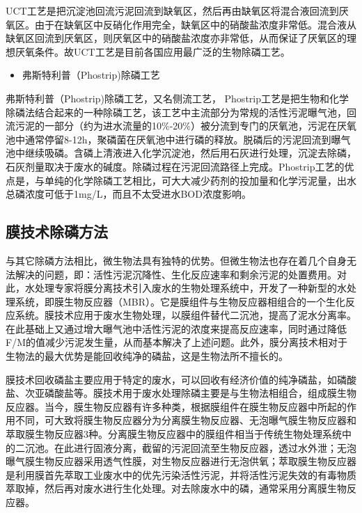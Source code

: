 \documentclass[]{book}
\providecommand{\tightlist}{%
  \setlength{\itemsep}{0pt}\setlength{\parskip}{0pt}}
\begin{document}
UCT工艺是把沉淀池回流污泥回流到缺氧区，然后再由缺氧区将混合液回流到厌氧区。由于在缺氧区中反硝化作用完全，缺氧区中的硝酸盐浓度非常低。混合液从缺氧区回流到厌氧区，则厌氧区中的硝酸盐浓度亦非常低，从而保证了厌氧区的理想厌氧条件。故UCT工艺是目前各国应用最广泛的生物除磷工艺。

\begin{itemize}
\tightlist
\item
  弗斯特利普（Phostrip)除磷工艺
\end{itemize}

弗斯特利普（Phostrip)除磷工艺，又名侧流工艺， Phostrip工艺是把生物和化学除磷法结合起来的一种除磷工艺，该工艺中主流部分为常规的活性污泥曝气池，回流污泥的一部分（约为进水流量的10\%-20\%）被分流到专门的厌氧池，污泥在厌氧池中通常停留8-12h，聚磷菌在厌氧池中进行磷的释放。脱磷后的污泥回流到曝气池中继续吸磷。含磷上清液进入化学沉淀池，然后用石灰进行处理，沉淀去除磷，石灰剂量取决于废水的碱度。除磷过程在污泥回流路径上完成。Phostrip工艺的优点是，与单纯的化学除磷工艺相比，可大大减少药剂的投加量和化学污泥量，出水总磷浓度可低于1mg/L，而且不太受进水BOD浓度影响。

\hypertarget{ux819cux6280ux672fux9664ux78f7ux65b9ux6cd5}{%
\subsection{膜技术除磷方法}\label{ux819cux6280ux672fux9664ux78f7ux65b9ux6cd5}}

与其它除磷方法相比，微生物法具有独特的优势。但微生物法也存在着几个自身无法解决的问题，即：活性污泥沉降性、生化反应速率和剩余污泥的处置费用。对此，水处理专家将膜分离技术引入废水的生物处理系统中，开发了一种新型的水处理系统，即膜生物反应器（MBR）。它是膜组件与生物反应器相组合的一个生化反应系统。膜技术应用于废水生物处理，以膜组件替代二沉池，提高了泥水分离率。在此基础上又通过增大曝气池中活性污泥的浓度来提高反应速率，同时通过降低F/M的值减少污泥发生量，从而基本解决了上述问题。此外，膜分离技术相对于生物法的最大优势是能回收纯净的磷盐，这是生物法所不擅长的。

膜技术回收磷盐主要应用于特定的废水，可以回收有经济价值的纯净磷盐，如磷酸盐、次亚磷酸盐等。膜技术用于废水处理除磷主要是与生物法相组合，组成膜生物反应器。当今，膜生物反应器有许多种类，根据膜组件在膜生物反应器中所起的作用不同，可大致将膜生物反应器分为分离膜生物反应器、无泡曝气膜生物反应器和萃取膜生物反应器3种。分离膜生物反应器中的膜组件相当于传统生物处理系统中的二沉池。在此进行固液分离，截留的污泥回流至生物反应器，透过水外泄；无泡曝气膜生物反应器采用透气性膜，对生物反应器进行无泡供氧；萃取膜生物反应器是利用膜首先萃取工业废水中的优先污染活性污泥，并将活性污泥失效的有毒物质萃取掉，然后再对废水进行生化处理。对去除废水中的磷，通常采用分离膜生物反应器。
\end{document}
